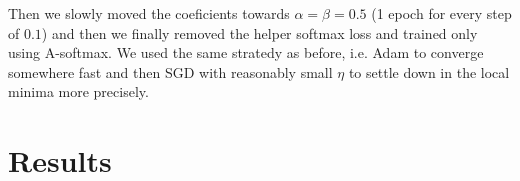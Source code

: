 \medskip
\noindent
Then we slowly moved the coeficients towards $ \alpha = \beta = 0.5 $ (1 epoch for every step of $ 0.1 $) and then we finally removed the helper softmax loss and trained only using A-softmax. We used the same stratedy as before, i.e. Adam to converge somewhere fast and then SGD with reasonably small $ \eta $ to settle down in the local minima more precisely.

\section{Results}
